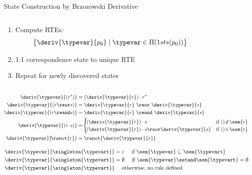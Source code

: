 \begin{frame}{      State Construction by   Brzozowski Derivative}
  \begin{columns}
    \begin{column}{0.4\textwidth}
      \begin{enumerate}
      \item Compute RTEs:
      \[\big\{\deriv{\typevar}{p_0} \mid \typevar \in \Pi(1sts(p_0))\big\}\]

      \item 1:1 correspondence state to unique RTE

      \item Repeat for newly discovered states

      \end{enumerate}

    \end{column}
    \begin{column}{0.6\textwidth}
      \scalebox{0.8}{}%
    \end{column}
  \end{columns}
\end{frame}


\newsavebox\boxa
\begin{lrbox}{\boxa}
  \begin{minipage}{0.4\textwidth}
\begin{align*}
  \deriv{\typevar}{(r^{*})}      &= (\deriv{\typevar}{r}) \cdot r^{*}\\
  \deriv{\typevar}{(r \reor s)}   &= \deriv{\typevar}{r} ~ \reor~ \deriv{\typevar}{s}\\
  \deriv{\typevar}{(r \reand s)} &= \deriv{\typevar}{r} ~ \reand~  \deriv{\typevar}{s}\\
  \deriv{\typevar}{(r\!\cdot\! s)} & =\! \begin{cases}
    \!(\deriv{\typevar}{r})\cdot s & \text{if $()\!\not\in\!\sem{r}$} \\
    \!(\deriv{\typevar}{r})\cdot s \reor \deriv{\typevar}{s} & \text{if $()\!\in\!\sem{r}$}
  \end{cases}\\
  \deriv{\typevar}{\!\renot{r}}  &= \renot{\deriv{\typevar}{r}}
\end{align*}
  \end{minipage}
\end{lrbox}



\newsavebox\boxb
\begin{lrbox}{\boxb}
  \begin{minipage}{0.55\textwidth}
\begin{align*}
  \deriv{\typevar}{\singleton{\typevart}} &= \varepsilon \quad \text{ if } \sem{\typevar} \subseteq \sem{\typevart} \\
  \deriv{\typevar}{\singleton{\typevart}} &= \emptyset \quad \text{ if } \sem{\typevar} \setand \sem{\typevart}=\emptyset         \\
  \deriv{\typevar}{\singleton{\typevart}} &\quad   \text{ otherwise, no rule defined}   
\end{align*}
  \end{minipage}
\end{lrbox}



